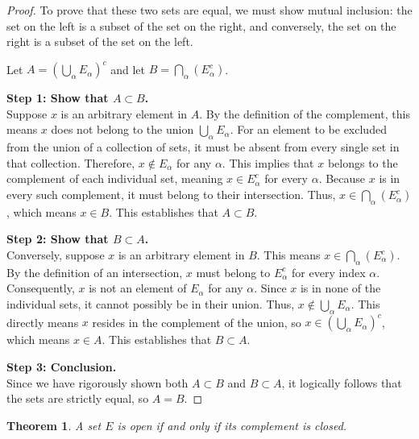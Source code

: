 \documentclass{article}
\theoremstyle{mythm}
\newtheorem{theorem}{Theorem}[section]
\begin{document}
\begin{proof}
To prove that these two sets are equal, we must show mutual inclusion: the set on the left is a subset of the set on the right, and conversely, the set on the right is a subset of the set on the left.

Let $A = \left(\bigcup_\alpha E_\alpha\right)^c$ and let $B = \bigcap_\alpha \left(E_\alpha^c\right)$. 

\textbf{Step 1: Show that $A \subset B$.} \\
Suppose $x$ is an arbitrary element in $A$. By the definition of the complement, this means $x$ does not belong to the union $\bigcup_\alpha E_\alpha$.
For an element to be excluded from the union of a collection of sets, it must be absent from every single set in that collection. Therefore, $x \notin E_\alpha$ for any $\alpha$. 
This implies that $x$ belongs to the complement of each individual set, meaning $x \in E_\alpha^c$ for every $\alpha$. 
Because $x$ is in every such complement, it must belong to their intersection. Thus, $x \in \bigcap_\alpha \left(E_\alpha^c\right)$, which means $x \in B$. This establishes that $A \subset B$. 

\textbf{Step 2: Show that $B \subset A$.} \\
Conversely, suppose $x$ is an arbitrary element in $B$. This means $x \in \bigcap_\alpha \left(E_\alpha^c\right)$. 
By the definition of an intersection, $x$ must belong to $E_\alpha^c$ for every index $\alpha$. 
Consequently, $x$ is not an element of $E_\alpha$ for any $\alpha$.
Since $x$ is in none of the individual sets, it cannot possibly be in their union. Thus, $x \notin \bigcup_\alpha E_\alpha$. 
This directly means $x$ resides in the complement of the union, so $x \in \left(\bigcup_\alpha E_\alpha\right)^c$, which means $x \in A$. This establishes that $B \subset A$. 

\textbf{Step 3: Conclusion.} \\
Since we have rigorously shown both $A \subset B$ and $B \subset A$, it logically follows that the sets are strictly equal, so $A = B$.
\end{proof}
\begin{theorem}
A set $E$ is open if and only if its complement is closed.
\end{theorem}
\end{document}
